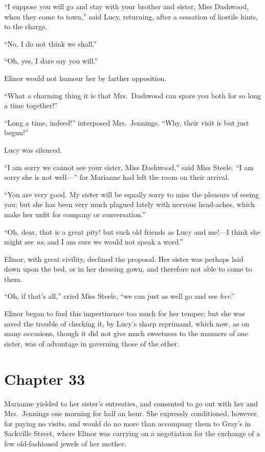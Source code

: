 ``I suppose you will go and stay with your brother
and sister, Miss Dashwood, when they come to town,''
said Lucy, returning, after a cessation of hostile hints,
to the charge.

``No, I do not think we shall.''

``Oh, yes, I dare say you will.''

Elinor would not humour her by farther opposition.

``What a charming thing it is that Mrs.\ Dashwood can
spare you both for so long a time together!''

``Long a time, indeed!'' interposed Mrs.\ Jennings.
``Why, their visit is but just begun!''

Lucy was silenced.

``I am sorry we cannot see your sister, Miss Dashwood,''
said Miss Steele.  ``I am sorry she is not well---''
for Marianne had left the room on their arrival.

``You are very good.  My sister will be equally
sorry to miss the pleasure of seeing you; but she has
been very much plagued lately with nervous head-aches,
which make her unfit for company or conversation.''

``Oh, dear, that is a great pity! but such old
friends as Lucy and me!---I think she might see \emph{us};
and I am sure we would not speak a word.''

Elinor, with great civility, declined the proposal.
Her sister was perhaps laid down upon the bed, or in her
dressing gown, and therefore not able to come to them.

``Oh, if that's all,'' cried Miss Steele, ``we can
just as well go and see \emph{her}.''

Elinor began to find this impertinence too much for
her temper; but she was saved the trouble of checking it,
by Lucy's sharp reprimand, which now, as on many occasions,
though it did not give much sweetness to the manners
of one sister, was of advantage in governing those of
the other.



\chapter{Chapter 33}


 Marianne yielded to her
sister's entreaties, and consented to go out with her
and Mrs.\ Jennings one morning for half an hour. She
expressly conditioned, however, for paying no visits,
and would do no more than accompany them to Gray's in
Sackville Street, where Elinor was carrying on a negotiation
for the exchange of a few old-fashioned jewels of her mother.

